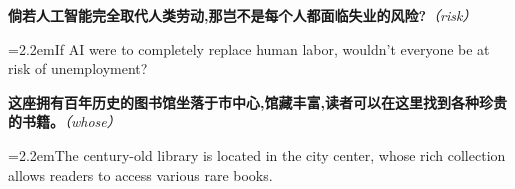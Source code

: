 \documentclass[11pt,a4paper]{article}
\newcommand{\num}[1]{\makebox[1.9em][r]{#1.}\hspace{0.3em}}
\newcommand{\prompt}[1]{\emph{\textcolor{tipblue}{\small（#1）}}}
\begin{document}
\begin{minipage}{\linewidth}

\num{23}\textbf{倘若人工智能完全取代人类劳动,那岂不是每个人都面临失业的风险?}\prompt{risk}

\vspace{0.15em}

\noindent\hangindent=2.2em\hspace{2.2em}If AI were to completely replace human labor, wouldn’t everyone be at risk of unemployment?

\end{minipage}

\begin{minipage}{\linewidth}

\num{24}\textbf{这座拥有百年历史的图书馆坐落于市中心,馆藏丰富,读者可以在这里找到各种珍贵的书籍。}\prompt{whose}

\vspace{0.15em}

\noindent\hangindent=2.2em\hspace{2.2em}The century-old library is located in the city center, whose rich collection allows readers to access various rare books.

\end{minipage}
\end{document}
